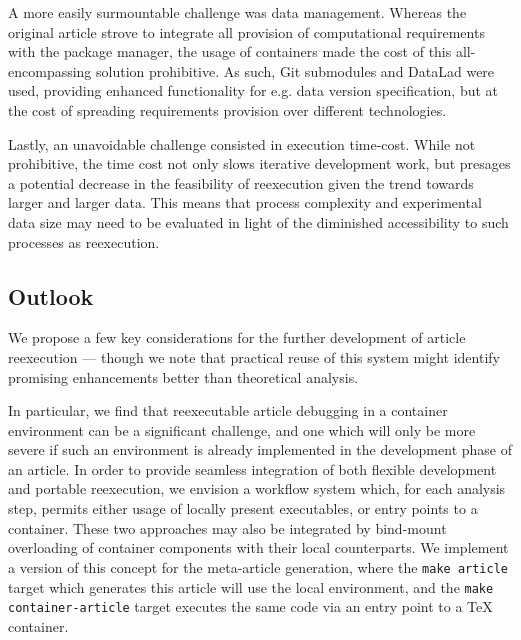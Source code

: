 A more easily surmountable challenge was data management.
Whereas the original article strove to integrate all provision of computational requirements with the package manager, the usage of containers made the cost of this all-encompassing solution prohibitive.
As such, Git submodules and DataLad were used, providing enhanced functionality for e.g. data version specification, but at the cost of spreading requirements provision over different technologies.

Lastly, an unavoidable challenge consisted in execution time-cost.
While not prohibitive, the time cost not only slows iterative development work, but presages a potential decrease in the feasibility of reexecution given the trend towards larger and larger data.
This means that process complexity and experimental data size may need to be evaluated in light of the diminished accessibility to such processes as reexecution.

\subsection{Outlook}

We propose a few key considerations for the further development of article reexecution — though we note that practical reuse of this system might identify promising enhancements better than theoretical analysis.

In particular, we find that reexecutable article debugging in a container environment can be a significant challenge, and one which will only be more severe if such an environment is already implemented in the development phase of an article.
In order to provide seamless integration of both flexible development and portable reexecution, we envision a workflow system which, for each analysis step, permits either usage of locally present executables, or entry points to a container.
These two approaches may also be integrated by bind-mount overloading of container components with their local counterparts.
We implement a version of this concept for the meta-article generation, where the \texttt{make article} target which generates this article will use the local environment, and the \texttt{make container-article} target executes the same code via an entry point to a \TeX{} container.

